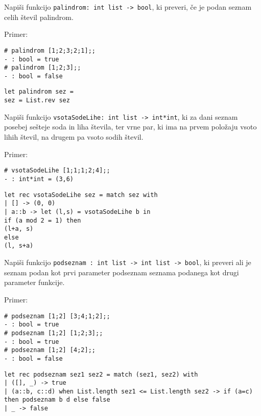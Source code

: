 \begin{ex}
Napi\v si funkcijo \texttt{palindrom: int list -> bool}, ki preveri, \v ce je podan seznam celih \v stevil palindrom.

Primer: \begin{verbatim}
# palindrom [1;2;3;2;1];;
- : bool = true
# palindrom [1;2;3];;
- : bool = false
\end{verbatim}

\begin{sol}
\begin{verbatim}
let palindrom sez =
sez = List.rev sez
\end{verbatim}
\end{sol}

\end{ex}
\begin{ex}
Napi\v si funkcijo \texttt{vsotaSodeLihe: int list -> int*int}, ki za dani seznam posebej se\v steje soda in liha \v stevila, ter vrne par, ki ima na prvem polo\v zaju vsoto lihih \v stevil, na drugem pa vsoto sodih \v stevil.

Primer: \begin{verbatim}
# vsotaSodeLihe [1;1;1;2;4];;
- : int*int = (3,6)
\end{verbatim}

\begin{sol}
\begin{verbatim}
let rec vsotaSodeLihe sez = match sez with
| [] -> (0, 0)
| a::b -> let (l,s) = vsotaSodeLihe b in 
if (a mod 2 = 1) then 
(l+a, s) 
else 
(l, s+a)
\end{verbatim}
\end{sol}

\end{ex}
\begin{ex}
Napi\v si funkcijo \texttt{podseznam : int list -> int list -> bool}, ki preveri ali je seznam podan kot prvi parameter podseznam seznama podanega kot drugi parameter funkcije.

Primer: \begin{verbatim}
# podseznam [1;2] [3;4;1;2];;
- : bool = true
# podseznam [1;2] [1;2;3];;
- : bool = true
# podseznam [1;2] [4;2];;
- : bool = false
\end{verbatim}

\begin{sol}
\begin{verbatim}
let rec podseznam sez1 sez2 = match (sez1, sez2) with
| ([], _) -> true
| (a::b, c::d) when List.length sez1 <= List.length sez2 -> if (a=c) then podseznam b d else false
| _ -> false
\end{verbatim}
\end{sol}


\end{ex}

